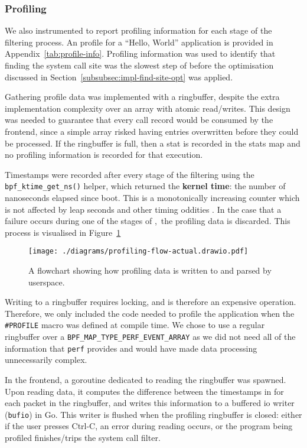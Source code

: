 \subsubsection{Profiling}

We also instrumented \af to report profiling information for each stage of the
filtering process. An profile for a ``Hello, World'' application is provided in 
Appendix~\ref{tab:profile-info}. Profiling information was used to identify that
finding the system call site was the slowest step of \af before the optimisation
discussed in Section~\ref{subsubsec:impl-find-site-opt} was applied.

Gathering profile data was implemented with a ringbuffer, despite the extra
implementation complexity over an array with atomic read/writes. This design was
needed to guarantee that every call record would be consumed by the frontend, since a 
simple array risked having entries overwritten before they could be processed.
If the ringbuffer is full, then a stat is recorded in the stats map and no
profiling information is recorded for that execution.

Timestamps were recorded after every stage of the filtering using the
\texttt{bpf\_ktime\_get\_ns()} helper, which returned the \textbf{kernel time}:
the number of nanoseconds elapsed since boot. This is a monotonically increasing
counter which is not affected by leap seconds and other timing oddities \cite{ebpf-bpf-ktime-get-ns-2025}. In the
case that a failure occurs during one of the stages of \afss,~the profiling data
is discarded. This process is visualised in Figure~\ref{fig:profiling-data-flow}


\begin{figure}[hbpt]
\centering
\texttt{[image: ./diagrams/profiling-flow-actual.drawio.pdf]}
\caption{A flowchart showing how profiling data is written to and parsed by
userspace.}
\label{fig:profiling-data-flow}
\end{figure}

Writing to a ringbuffer requires locking, and is therefore an expensive
operation. Therefore, we only included the code needed to profile the
application when the \texttt{\#PROFILE} macro was defined at compile time.
We chose to use a regular ringbuffer over a 
\texttt{BPF\_MAP\_TYPE\_PERF\_EVENT\_ARRAY} as we did not need all of the
information that \texttt{perf} provides and would have made data processing
unnecessarily complex.

In the frontend, a goroutine dedicated to reading the ringbuffer was spawned.
Upon reading data, it computes the difference between the timestamps in for each 
packet in the ringbuffer, and writes this information to a buffered \ac{io} 
writer (\texttt{bufio}) in Go. This writer is flushed when the profiling 
ringbuffer is closed: either if the user presses Ctrl-C, an error during 
reading occurs, or the program being profiled finishes/trips the system call 
filter.

